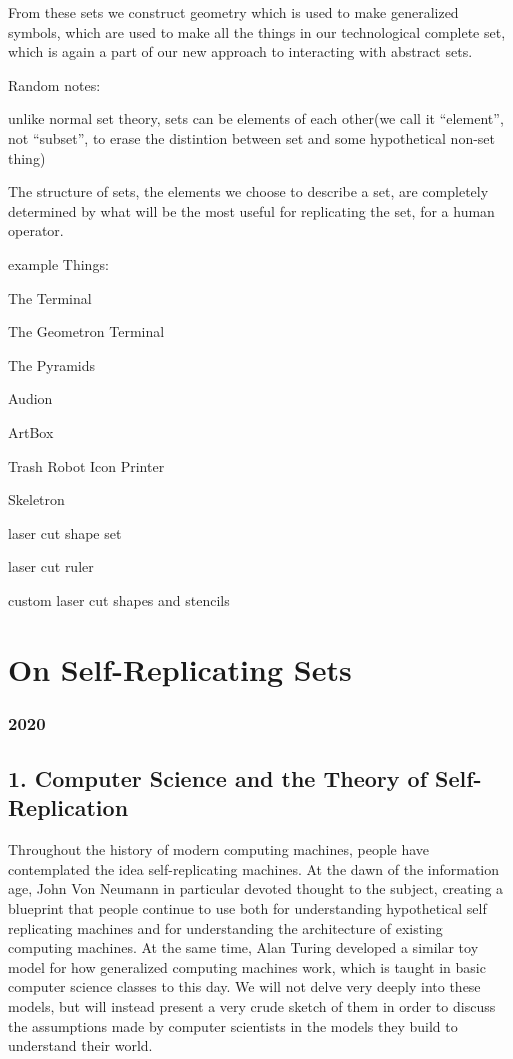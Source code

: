 From these sets we construct geometry which is used to make generalized
symbols, which are used to make all the things in our technological
complete set, which is again a part of our new approach to interacting
with abstract sets.

Random notes:

unlike normal set theory, sets can be elements of each other(we call it
``element'', not ``subset'', to erase the distintion between set and
some hypothetical non-set thing)

The structure of sets, the elements we choose to describe a set, are
completely determined by what will be the most useful for replicating
the set, for a human operator.

example Things:

The Terminal

The Geometron Terminal

The Pyramids

Audion

ArtBox

Trash Robot Icon Printer

Skeletron

laser cut shape set

laser cut ruler

custom laser cut shapes and stencils

\section{On Self-Replicating Sets}\label{on-self-replicating-sets}

\subsubsection{2020}\label{section}

\subsection{1. Computer Science and the Theory of
Self-Replication}\label{computer-science-and-the-theory-of-self-replication}

Throughout the history of modern computing machines, people have
contemplated the idea self-replicating machines. At the dawn of the
information age, John Von Neumann in particular devoted thought to the
subject, creating a blueprint that people continue to use both for
understanding hypothetical self replicating machines and for
understanding the architecture of existing computing machines. At the
same time, Alan Turing developed a similar toy model for how generalized
computing machines work, which is taught in basic computer science
classes to this day. We will not delve very deeply into these models,
but will instead present a very crude sketch of them in order to discuss
the assumptions made by computer scientists in the models they build to
understand their world.

